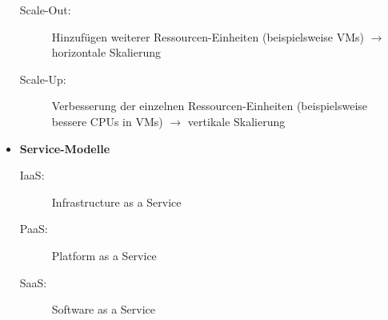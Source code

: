 \begin{itemize}
	\begin{description}
		\item[Scale-Out:] Hinzufügen weiterer Ressourcen-Einheiten (beispielsweise VMs) \(\rightarrow\) horizontale Skalierung
		\item[Scale-Up:] Verbesserung der einzelnen Ressourcen-Einheiten (beispielsweise bessere CPUs in VMs) \(\rightarrow\) vertikale Skalierung
	\end{description}
	\item \textbf{Service-Modelle}
	\begin{description}
		\item[IaaS:] Infrastructure as a Service
		\item[PaaS:] Platform as a Service
		\item[SaaS:] Software as a Service
	\end{description}
\end{itemize}


